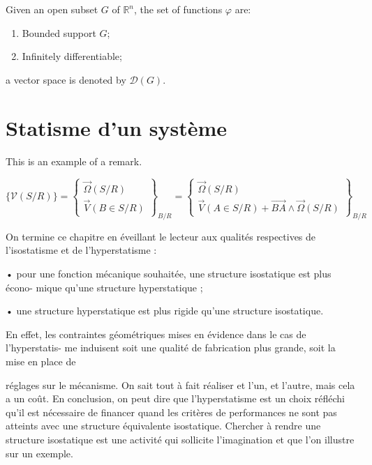 \documentclass[
	11pt, %
	fleqn, %
	a4paper, %
]{LegrandOrangeBook}
\begin{document}
\begin{notation} %
	Given an open subset $G$ of $\mathbb{R}^n$, the set of functions $\varphi$ are:
	\begin{enumerate}
		\item Bounded support $G$;
		\item Infinitely differentiable;
	\end{enumerate}
	a vector space is denoted by $\mathcal{D}(G)$. 
\end{notation}


\section{Statisme d'un système}

This is an example of a remark.

$\{ \mathcal{V} (S/R) \}
= \left\{ \begin{array}{c}
     \overrightarrow{\Omega} (S/R) \\
     \overrightarrow{V} (B \in S/R)
\end{array} \right\} _{B/R}
= \left\{ \begin{array}{c}
     \overrightarrow{\Omega} (S/R) \\
     \overrightarrow{V} (A \in S/R) +\overrightarrow{BA} \wedge \overrightarrow{\Omega}(S/R)
\end{array} \right\} _{B/R}$

\begin{remark}
    On termine ce chapitre en éveillant le lecteur aux qualités respectives de l’isostatisme
et de l’hyperstatisme :

• pour une fonction mécanique souhaitée, une structure isostatique est plus écono-
mique qu’une structure hyperstatique ;

• une structure hyperstatique est plus rigide qu’une structure isostatique.

En effet, les contraintes géométriques mises en évidence dans le cas de l’hyperstatis-
me induisent soit une qualité de fabrication plus grande, soit la mise en place de

réglages sur le mécanisme. On sait tout à fait réaliser et l’un, et l’autre, mais cela a un
coût. En conclusion, on peut dire que l’hyperstatisme est un choix réfléchi qu’il est
nécessaire de financer quand les critères de performances ne sont pas atteints avec une
structure équivalente isostatique.
Chercher à rendre une structure isostatique est une activité qui sollicite l’imagination
et que l’on illustre sur un exemple.
\end{remark}
\end{document}
